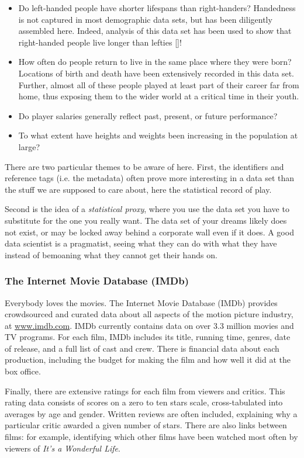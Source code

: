 \documentclass[10pt]{article}
\begin{document}
\begin{itemize}
  \item Do left-handed people have shorter lifespans than right-handers? Handedness is not captured in most demographic data sets, but has been diligently assembled here. Indeed, analysis of this data set has been used to show that right-handed people live longer than lefties [\cite{halpern1988right}]!
  \item How often do people return to live in the same place where they were born? Locations of birth and death have been extensively recorded in this data set. Further, almost all of these people played at least part of their career far from home, thus exposing them to the wider world at a critical time in their youth.
  \item Do player salaries generally reflect past, present, or future performance?
  \item To what extent have heights and weights been increasing in the population at large?
\end{itemize}

There are two particular themes to be aware of here. First, the identifiers and reference tags (i.e. the metadata) often prove more interesting in a data set than the stuff we are supposed to care about, here the statistical record of play.

Second is the idea of a \textit{statistical proxy}, where you use the data set you have to substitute for the one you really want. The data set of your dreams likely does not exist, or may be locked away behind a corporate wall even if it does. A good data scientist is a pragmatist, seeing what they can do with what they have instead of bemoaning what they cannot get their hands on.

\subsubsection*{The Internet Movie Database (IMDb)}
Everybody loves the movies. The Internet Movie Database (IMDb) provides crowdsourced and curated data about all aspects of the motion picture industry, at \href{http://www.imdb.com}{www.imdb.com}. IMDb currently contains data on over 3.3 million movies and TV programs. For each film, IMDb includes its title, running time, genres, date of release, and a full list of cast and crew. There is financial data about each production, including the budget for making the film and how well it did at the box office.

Finally, there are extensive ratings for each film from viewers and critics. This rating data consists of scores on a zero to ten stars scale, cross-tabulated into averages by age and gender. Written reviews are often included, explaining why a particular critic awarded a given number of stars. There are also links between films: for example, identifying which other films have been watched most often by viewers of \textit{It's a Wonderful Life}.
\end{document}
